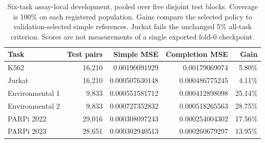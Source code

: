 \begin{table}[htbp]\centering\small
\begin{tabular}{lrrrr}\toprule
Task & Test pairs & Simple MSE & Completion MSE & Gain\\\midrule
K562 & 16,210 & 0.00190091929 & 0.00179069074 & 5.80\%\\
Jurkat & 16,210 & 0.000507630148 & 0.000486775245 & 4.11\%\\
Environmental 1 & 9,833 & 0.000551581712 & 0.000412898098 & 25.14\%\\
Environmental 2 & 9,833 & 0.000727352832 & 0.000518265563 & 28.75\%\\
PARPi 2022 & 29,016 & 0.000308097243 & 0.000254004302 & 17.56\%\\
PARPi 2023 & 28,651 & 0.000302940513 & 0.000260679297 & 13.95\%\\
\bottomrule\end{tabular}
\caption{Six-task assay-local development, pooled over five disjoint test blocks. Coverage is 100\% on each registered population. Gains compare the selected policy to validation-selected simple references. Jurkat fails the unchanged 5\% all-task criterion. Scores are not measurements of a single exported fold-0 checkpoint.}
\label{tab:v1-growth}\end{table}
